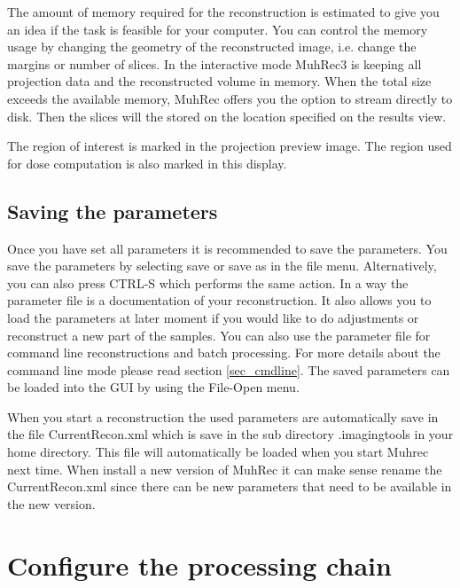 \documentclass[a4paper]{scrreprt}
\begin{document}
The amount of memory required for the reconstruction is estimated to give you an idea if the task is feasible for your computer. You can control the memory usage by changing the geometry of the reconstructed image, i.e. change the margins or number of slices. In the interactive mode MuhRec3 is keeping all projection data and the reconstructed volume in memory. When the total size exceeds the available memory, MuhRec offers you the option to stream directly to disk. Then the slices will the stored on the location specified on the results view.


The region of interest is marked in the projection preview image. The region used for dose computation is also marked in this display.

\subsection{Saving the parameters}
Once you have set all parameters it is recommended to save the parameters. You save the parameters by selecting save or save as in the file menu. Alternatively, you can also press CTRL-S which performs the same action. In a way the parameter file is a documentation of your reconstruction. It also allows you to load the parameters at later moment if you would like to do adjustments or reconstruct a new part of the samples. You can also use the parameter file for command line reconstructions and batch processing. For more details about the command line mode please read section \ref{sec_cmdline}. The saved parameters can be loaded into the GUI by using the File-Open menu.

When you start a reconstruction the used parameters are automatically save in the file CurrentRecon.xml which is save in the sub directory .imagingtools in your home directory. This file will automatically be loaded when you start Muhrec next time. When install a new version of MuhRec it can make sense rename the CurrentRecon.xml since there can be new parameters that need to be available in the new version.

\section{Configure the processing chain}
\end{document}

